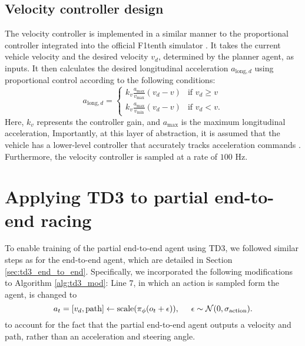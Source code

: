 
\subsection{Velocity controller design}

The velocity controller is implemented in a similar manner to the proportional controller integrated into the official F1tenth simulator \cite{f1tenth}.
It takes the current vehicle velocity and the desired velocity $v_d$, determined by the planner agent, as inputs. 
It then calculates the desired longitudinal acceleration $a_{\text{long},d}$ using proportional control according to the following conditions:
\begin{equation}
    a_{\text{long},d} = 
    \begin{cases}
        k_v \frac{a_{\text{max}}}{v_{\text{max}}}(v_d - v) & \text{if } v_d \geq v\\
        k_v \frac{a_{\text{max}}}{v_{\text{min}}}(v_d - v) & \text{if } v_d < v.
    \end{cases}
\label{eq:vel_control}
\end{equation}
Here, $k_v$ represents the controller gain, and $a_{\text{max}}$ is the maximum longitudinal acceleration,
Importantly, at this layer of abstraction, it is assumed that the vehicle has a lower-level controller that accurately tracks acceleration commands \cite{Betz2021, Rajamani2012}.
Furthermore, the velocity controller is sampled at a rate of $100$ Hz.








\section{Applying TD3 to partial end-to-end racing}\label{sec:TD3_pete}

To enable training of the partial end-to-end agent using TD3, we followed similar steps as for the end-to-end agent, which are detailed in Section \ref{sec:td3_end_to_end}. 
Specifically, we incorporated the following modifications to Algorithm \ref{alg:td3_mod}:
Line $7$, in which an action is sampled form the agent, is changed to
\begin{equation}\label{eq:pete_agent_sample}
    a_{t} = [v_d, \text{path}] \leftarrow \text{scale}( \pi_{\phi}(o_t+\epsilon) ), \hspace{0.5cm} \epsilon \sim \mathcal{N}(0, \sigma_{\text{action}}).
\end{equation}
to account for the fact that the partial end-to-end agent outputs a velocity and path, rather than an acceleration and steering angle.



